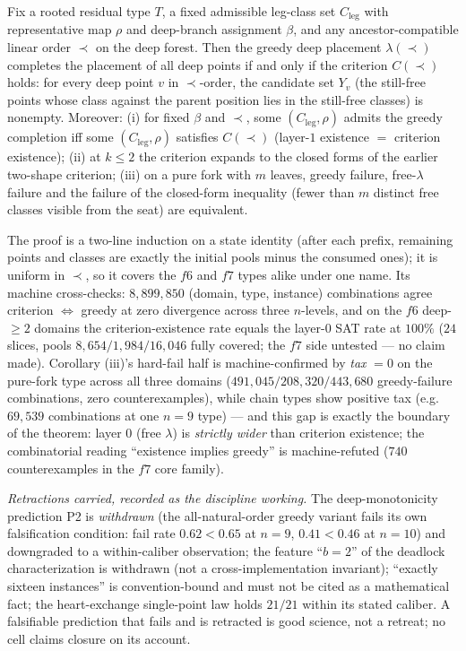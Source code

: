 \begin{theorem}\label{thm:betacinf}
Fix a rooted residual type $T$, a fixed admissible leg-class set $C_{\mathrm{leg}}$ with
representative map $\rho$ and deep-branch assignment $\beta$, and any ancestor-compatible
linear order $\prec$ on the deep forest. Then the greedy deep placement $\lambda(\prec)$
completes the placement of all deep points if and only if the criterion $C(\prec)$ holds:
for every deep point $v$ in $\prec$-order, the candidate set $Y_v$ (the still-free points
whose class against the parent position lies in the still-free classes) is nonempty.
Moreover: (i) for fixed $\beta$ and $\prec$, some $(C_{\mathrm{leg}},\rho)$ admits the
greedy completion iff some $(C_{\mathrm{leg}},\rho)$ satisfies $C(\prec)$ (layer-$1$
existence $=$ criterion existence); (ii) at $k\le2$ the criterion expands to the closed
forms of the earlier two-shape criterion; (iii) on a pure fork with $m$ leaves, greedy
failure, free-$\lambda$ failure and the failure of the closed-form inequality (fewer than
$m$ distinct free classes visible from the seat) are equivalent.
\end{theorem}

The proof is a two-line induction on a state identity (after each prefix, remaining points
and classes are exactly the initial pools minus the consumed ones); it is uniform in
$\prec$, so it covers the $f6$ and $f7$ types alike under one name. Its machine
cross-checks: $8{,}899{,}850$ (domain, type, instance) combinations agree
criterion $\iff$ greedy at zero divergence across three $n$-levels, and on the $f6$
deep-$\ge2$ domains the criterion-existence rate equals the layer-$0$ SAT rate at
$100\%$ ($24$ slices, pools $8{,}654/1{,}984/16{,}046$ fully covered; the $f7$ side
untested --- no claim made). Corollary (iii)'s hard-fail half is machine-confirmed by
\emph{tax} $=0$ on the pure-fork type across all three domains ($491{,}045/208{,}320/443{,}680$
greedy-failure combinations, zero counterexamples), while chain types show positive tax
(e.g.\ $69{,}539$ combinations at one $n=9$ type) --- and this gap is exactly the boundary
of the theorem: layer $0$ (free $\lambda$) is \emph{strictly wider} than criterion
existence; the combinatorial reading ``existence implies greedy'' is machine-refuted
($740$ counterexamples in the $f7$ core family).

\emph{Retractions carried, recorded as the discipline working.} The deep-monotonicity
prediction P2 is \emph{withdrawn} (the all-natural-order greedy variant fails its own
falsification condition: fail rate $0.62<0.65$ at $n=9$, $0.41<0.46$ at $n=10$) and
downgraded to a within-caliber observation; the feature ``$b=2$'' of the deadlock
characterization is withdrawn (not a cross-implementation invariant); ``exactly sixteen
instances'' is convention-bound and must not be cited as a mathematical fact; the
heart-exchange single-point law holds $21/21$ within its stated caliber. A falsifiable
prediction that fails and is retracted is good science, not a retreat; no cell claims
closure on its account.

